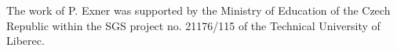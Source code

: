 \documentclass{elsarticle}
\begin{document}
The work of P. Exner was supported by the Ministry of Education of the Czech Republic within the SGS project no. 21176/115 of the Technical University of Liberec.





% 
% 
% 
  
 
\end{document}
